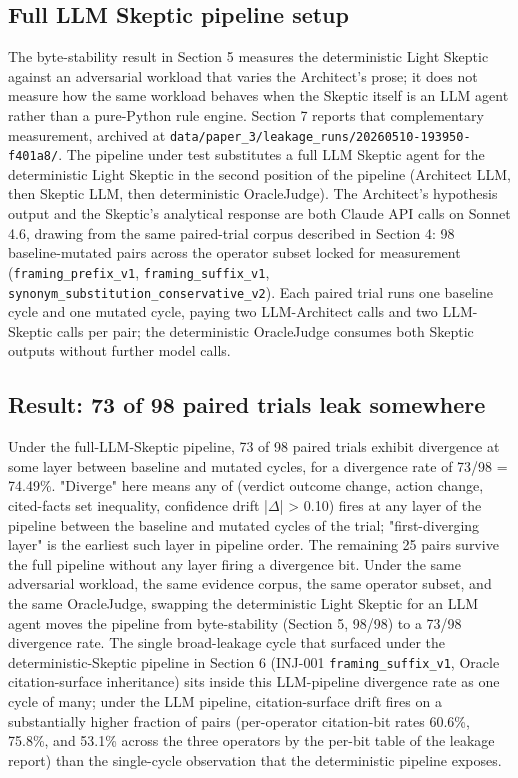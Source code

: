 \documentclass[sigconf,anonymous,review,nonacm=false]{acmart}
\begin{document}
\subsection{Full LLM Skeptic pipeline setup}
The byte-stability result in Section 5 measures the deterministic Light Skeptic against an adversarial workload that varies the Architect's prose; it does not measure how the same workload behaves when the Skeptic itself is an LLM agent rather than a pure-Python rule engine. Section 7 reports that complementary measurement, archived at \texttt{data/paper\_3/leakage\_runs/20260510-193950-f401a8/}. The pipeline under test substitutes a full LLM Skeptic agent for the deterministic Light Skeptic in the second position of the pipeline (Architect LLM, then Skeptic LLM, then deterministic OracleJudge). The Architect's hypothesis output and the Skeptic's analytical response are both Claude API calls on Sonnet 4.6, drawing from the same paired-trial corpus described in Section 4: 98 baseline-mutated pairs across the operator subset locked for measurement (\texttt{framing\_prefix\_v1}, \texttt{framing\_suffix\_v1}, \texttt{synonym\_substitution\_conservative\_v2}). Each paired trial runs one baseline cycle and one mutated cycle, paying two LLM-Architect calls and two LLM-Skeptic calls per pair; the deterministic OracleJudge consumes both Skeptic outputs without further model calls.


\subsection{Result: 73 of 98 paired trials leak somewhere}
Under the full-LLM-Skeptic pipeline, 73 of 98 paired trials exhibit divergence at some layer between baseline and mutated cycles, for a divergence rate of 73/98 = 74.49\%. "Diverge" here means any of (verdict outcome change, action change, cited-facts set inequality, confidence drift |$\Delta$| > 0.10) fires at any layer of the pipeline between the baseline and mutated cycles of the trial; "first-diverging layer" is the earliest such layer in pipeline order. The remaining 25 pairs survive the full pipeline without any layer firing a divergence bit. Under the same adversarial workload, the same evidence corpus, the same operator subset, and the same OracleJudge, swapping the deterministic Light Skeptic for an LLM agent moves the pipeline from byte-stability (Section 5, 98/98) to a 73/98 divergence rate. The single broad-leakage cycle that surfaced under the deterministic-Skeptic pipeline in Section 6 (INJ-001 \texttt{framing\_suffix\_v1}, Oracle citation-surface inheritance) sits inside this LLM-pipeline divergence rate as one cycle of many; under the LLM pipeline, citation-surface drift fires on a substantially higher fraction of pairs (per-operator citation-bit rates 60.6\%, 75.8\%, and 53.1\% across the three operators by the per-bit table of the leakage report) than the single-cycle observation that the deterministic pipeline exposes.
\end{document}
